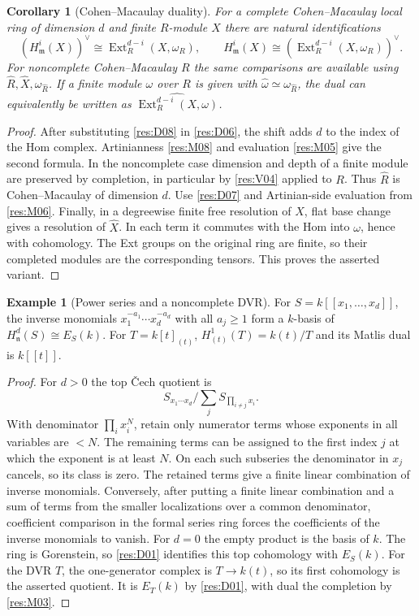\documentclass[11pt,oneside,openany]{book}
\newtheorem{corollary}[theorem]{Corollary}
\theoremstyle{definition}
\newtheorem{example}[theorem]{Example}
\theoremstyle{remark}
\begin{document}
\begin{corollary}[Cohen--Macaulay duality]\label{res:D09}
For a complete Cohen--Macaulay local ring of dimension $d$
and finite $R$-module $X$ there are natural identifications
\[
 (H^i_{\mathfrak m}(X))^\vee
       \cong \operatorname{Ext}^{d-i}_R(X,\omega_R),\qquad
 H^i_{\mathfrak m}(X)
       \cong (\operatorname{Ext}^{d-i}_R(X,\omega_R))^\vee .
\]
For noncomplete Cohen--Macaulay $R$ the same comparisons are
available using $\widehat R,\widehat X,\omega_{\widehat R}$.
If a finite module $\omega$ over $R$ is given with
$\widehat\omega\simeq\omega_{\widehat R}$, the dual can equivalently
be written as $\widehat{\operatorname{Ext}^{d-i}_R(X,\omega)}$.
\end{corollary}
\begin{proof}
After substituting \ref{res:D08} in \ref{res:D06}, the shift adds $d$ to
the index of the Hom complex. Artinianness \ref{res:M08} and
evaluation \ref{res:M05} give the second formula. In the
noncomplete case dimension and depth of a finite module
are preserved by completion, in particular by \ref{res:V04}
applied to $R$. Thus $\widehat R$ is Cohen--Macaulay of
dimension $d$. Use \ref{res:D07} and Artinian-side evaluation
from \ref{res:M06}. Finally, in a degreewise finite free
resolution of $X$, flat base change gives a resolution of
$\widehat X$. In each term it commutes with the Hom into
$\omega$, hence with cohomology. The Ext groups on the
original ring are finite, so their completed modules are the
corresponding tensors. This proves the asserted variant.
\end{proof}

\begin{example}[Power series and a noncomplete DVR]\label{res:E01}
For $S=k[[x_1,\ldots,x_d]]$, the inverse monomials
$x_1^{-a_1}\cdots x_d^{-a_d}$ with all $a_j\ge1$ form a $k$-basis
of $H^d_{\mathfrak n}(S)\cong E_S(k)$. For $T=k[t]_{(t)}$,
$H^1_{(t)}(T)=k(t)/T$ and its Matlis dual is $k[[t]]$.
\end{example}
\begin{proof}
For $d>0$ the top \v{C}ech quotient is
\[
 S_{x_1\cdots x_d}\bigg/\sum_j S_{\prod_{i\ne j} x_i}.
\]
With denominator $\prod_i x_i^N$, retain only numerator terms
whose exponents in all variables are $<N$. The remaining terms
can be assigned to the first index $j$ at which the exponent is
at least $N$. On each such subseries the denominator in $x_j$
cancels, so its class is zero. The retained terms give a finite
linear combination of inverse monomials. Conversely, after
putting a finite linear combination and a sum of terms from the
smaller localizations over a common denominator, coefficient
comparison in the formal series ring forces the coefficients
of the inverse monomials to vanish. For $d=0$ the empty product
is the basis of $k$. The ring is Gorenstein, so \ref{res:D01}
identifies this top cohomology with $E_S(k)$.
For the DVR $T$, the one-generator complex is
$T\to k(t)$, so its first cohomology is the asserted quotient.
It is $E_T(k)$ by \ref{res:D01}, with dual the completion by
\ref{res:M03}.
\end{proof}
\end{document}
